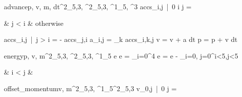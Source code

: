 \documentclass[12pt,a4paper]{book}
\begin{document}
\begin{eqcode}{advance}{p, v, m, dt}{^2_{5,3}, ^2_{5,3}, ^1_5, }{^3}
    accs_{i,j}\  |\  0 \leq i   \leq j  =
        \begin{cases}
             & j < i  & otherwise
        \end{cases} \lend
    accs_{i,j}\  |\  j > i = - accs_{j,i} \lend
    a_{i,j} = \sum \limits_k accs_{i,k,j} \lend
    v = v + a \cdot dt \lend
    p = p + v \cdot dt \lend
     \lend
\end{eqcode}

\begin{eqcode}{energy}{p, v, m}{^2_{5,3},
    ^2_{5,3}, ^1_5}{}
    e \in {} \lend
    e = \sum\limits_{i=0}^{4}  \lend
    e = e - \sum\limits_{i=0, j=0}^{i<5,j<5}
    \begin{cases}
         & i < j  &  \lend
    \end{cases} \lend
\end{eqcode}

\begin{eqcode}{offset\_momentum}{v, m}{^2_{5,3}, 
    ^1_5}{^2_{5,3}}
    v_{0,j}\  |\  0 \leq j  =  \lend
     \lend
\end{eqcode}
\end{document}
